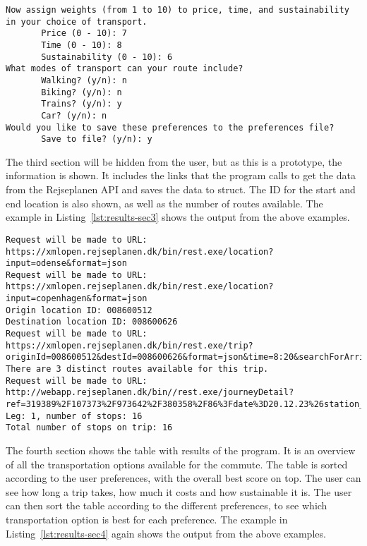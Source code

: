 \begin{lstlisting}[label={lst:results-sec2}, caption={Custom preferences input.}, captionpos=b, language={}]
Now assign weights (from 1 to 10) to price, time, and sustainability in your choice of transport.
       Price (0 - 10): 7
       Time (0 - 10): 8
       Sustainability (0 - 10): 6
What modes of transport can your route include?
       Walking? (y/n): n
       Biking? (y/n): n
       Trains? (y/n): y
       Car? (y/n): n
Would you like to save these preferences to the preferences file?
       Save to file? (y/n): y
\end{lstlisting}

The third section will be hidden from the user, but as this is a prototype, the information is shown.
It includes the links that the program calls to get the data from the Rejseplanen API and saves the data to struct.
The ID for the start and end location is also shown, as well as the number of routes available.
The example in Listing~\ref{lst:results-sec3} shows the output from the above examples.

\begin{lstlisting}[label={lst:results-sec3}, caption={Backend data output.}, captionpos=b, language={}]
Request will be made to URL: https://xmlopen.rejseplanen.dk/bin/rest.exe/location?input=odense&format=json
Request will be made to URL: https://xmlopen.rejseplanen.dk/bin/rest.exe/location?input=copenhagen&format=json
Origin location ID: 008600512
Destination location ID: 008600626
Request will be made to URL: https://xmlopen.rejseplanen.dk/bin/rest.exe/trip?originId=008600512&destId=008600626&format=json&time=8:20&searchForArrival=1&useBus=0
There are 3 distinct routes available for this trip.
Request will be made to URL: http://webapp.rejseplanen.dk/bin//rest.exe/journeyDetail?ref=319389%2F107373%2F973642%2F380358%2F86%3Fdate%3D20.12.23%26station_evaId%3D8600512%26format%3Djson
Leg: 1, number of stops: 16
Total number of stops on trip: 16
\end{lstlisting}

The fourth section shows the table with results of the program.
It is an overview of all the transportation options available for the commute.
The table is sorted according to the user preferences, with the overall best score on top.
The user can see how long a trip takes, how much it costs and how sustainable it is.
The user can then sort the table according to the different preferences, to see which transportation option is best
for each preference.
The example in Listing~\ref{lst:results-sec4} again shows the output from the above examples.

